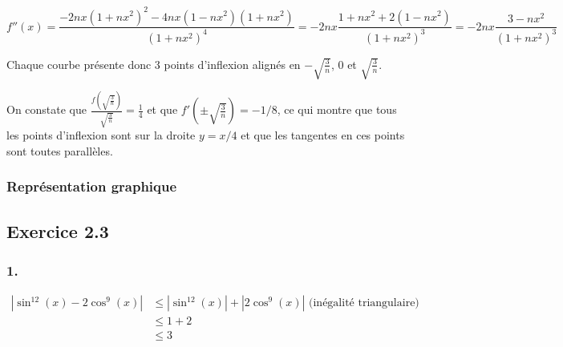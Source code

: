 \documentclass{report}
\begin{document}
\begin{displaymath}
	f''(x) = \frac{-2nx(1+nx^2)^2-4nx(1-nx^2)(1+nx^2)}{(1+nx^2)^4}
	       =-2nx\frac{1+nx^2+2(1-nx^2)}{(1+nx^2)^3}
	       = -2nx\frac{3-nx^2}{(1+nx^2)^3}
\end{displaymath}

Chaque courbe présente donc 3 points d'inflexion alignés en $-\sqrt{\frac{3}{n}}$, $0$ et $\sqrt{\frac{3}{n}}$.

On constate que $\frac{f(\sqrt{\frac{3}{n}})}{\sqrt{\frac{3}{n}}} = \frac{1}{4}$ et que $f'\left({\pm \sqrt{\frac{3}{n}}}\right)=-1/8$, ce qui montre que tous les points d'inflexion sont sur la droite
$y=x/4$ et que les tangentes en ces points sont toutes parallèles.

\subsubsection*{Représentation graphique}


\subsection*{Exercice 2.3}

\subsubsection*{1.}

\begin{equation*}
	\begin{split}
		|\sin^{12}(x) - 2\cos^9(x)| &\leq |\sin^{12}(x)|+ |2\cos^9(x)| \text{ (inégalité triangulaire)} \\
		                         &\leq 1 + 2 \\
		                         & \leq 3
	\end{split}
\end{equation*}
\end{document}
